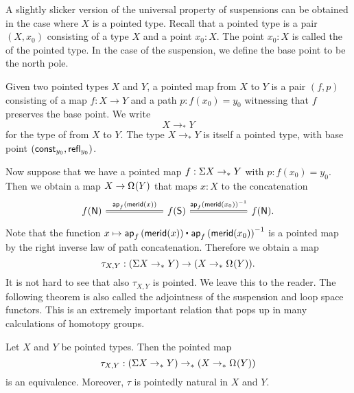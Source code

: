 A slightly slicker version of the universal property of suspensions can be obtained in the case where $X$ is a pointed type. Recall that a pointed type is a pair $(X,x_0)$ consisting of a type $X$ and a point $x_0:X$. The point $x_0:X$ is called the  of the pointed type. In the case of the suspension, we define the base point to be the north pole.

\begin{defn}
  Given two pointed types $X$ and $Y$, a pointed map from $X$ to $Y$ is a pair $(f,p)$ consisting of a map $f:X\to Y$ and a path $p:f(x_0)=y_0$ witnessing that $f$ preserves the base point. We write
  \begin{equation*}
    X\to_\ast Y
  \end{equation*}
  for the type of  from $X$ to $Y$. The type $X\to_\ast Y$ is itself a pointed type, with base point $(\mathsf{const}_{y_0},\mathsf{refl}_{y_0})$. 
\end{defn}

Now suppose that we have a pointed map $f:\Sigma X\to_\ast Y$ with $p:f(x_0)=y_0$. Then we obtain a map $X\to\Omega^{}(Y)$ that maps $x:X$ to the concatenation
\begin{equation*}
  \begin{tikzcd}[column sep=6em]
    f(\north) \arrow[r,equals,"\ap{f}{\merid(x)}"] & f(\south) \arrow[r,equals,"\ap{f}{\merid(x_0)}^{-1}"] & f(\north).
  \end{tikzcd}
\end{equation*}
Note that the function $x\mapsto\ct{\ap{f}{\merid(x)}}{\ap{f}{\merid(x_0)}^{-1}}$ is a pointed map by the right inverse law of path concatenation. Therefore we obtain a map
\begin{equation*}
  \tau_{X,Y} :(\Sigma X \to_\ast Y) \to (X \to_\ast \Omega^{}(Y)).
\end{equation*}
It is not hard to see that also $\tau_{X,Y}$ is pointed. We leave this to the reader. The following theorem is also called the adjointness of the suspension and loop space functors. This is an extremely important relation that pops up in many calculations of homotopy groups.

\begin{thm}
  Let $X$ and $Y$ be pointed types. Then the pointed map
  \begin{equation*}
    \tau_{X,Y} : (\Sigma X \to_\ast Y) \to_\ast (X\to_\ast \Omega^{}(Y))
  \end{equation*}
  is an equivalence. Moreover, $\tau$ is pointedly natural in $X$ and $Y$. 
\end{thm}


